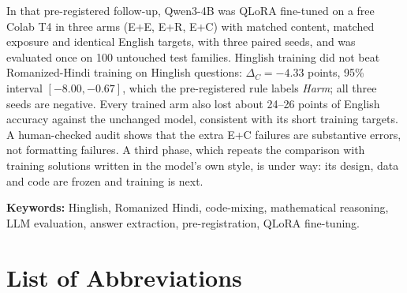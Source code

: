 \documentclass[12pt,a4paper,oneside]{report}
\renewcommand{\_}{\oldunderscore\allowbreak}
\begin{document}
In that pre-registered follow-up, Qwen3-4B was QLoRA fine-tuned on a free Colab T4 in three arms (E+E, E+R, E+C) with matched content, matched exposure and identical English targets, with three paired seeds, and was evaluated once on 100 untouched test families. Hinglish training did not beat Romanized-Hindi training on Hinglish questions: $\Delta_C = -4.33$ points, 95\% interval $[-8.00, -0.67]$, which the pre-registered rule labels \emph{Harm}; all three seeds are negative. Every trained arm also lost about 24--26 points of English accuracy against the unchanged model, consistent with its short training targets. A human-checked audit shows that the extra E+C failures are substantive errors, not formatting failures. A third phase, which repeats the comparison with training solutions written in the model's own style, is under way: its design, data and code are frozen and training is next.

\vspace{0.5cm}
\noindent\textbf{Keywords:} Hinglish, Romanized Hindi, code-mixing, mathematical reasoning, LLM evaluation, answer extraction, pre-registration, QLoRA fine-tuning.

\tableofcontents
\listoffigures
\listoftables

\chapter*{List of Abbreviations}
\thispagestyle{plain}
\end{document}
